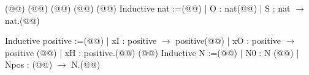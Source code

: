 (@\vspace{-0.04cm}@)
(@\vspace{-0.04cm}@)
(@\vspace{-0.04cm}@)
(@\vspace{-0.04cm}@)
(@\vspace{-0.14cm}@)
Inductive nat :=(@\vspace{-0.04cm}@)
| O : nat(@\vspace{-0.04cm}@)
| S : nat $\rightarrow$ nat.(@\vspace{-0.04cm}@)

Inductive positive :=(@\vspace{-0.04cm}@)
| xI : positive  $\rightarrow$ positive(@\vspace{-0.04cm}@)
| xO : positive  $\rightarrow$ positive (@\vspace{-0.04cm}@)
| xH : positive.(@\vspace{-0.04cm}@)
(@\vspace{-0.14cm}@)
Inductive N :=(@\vspace{-0.04cm}@)
| N0 : N (@\vspace{-0.04cm}@)
| Npos : (@@) $\rightarrow$ N.(@\vspace{-0.04cm}@)
